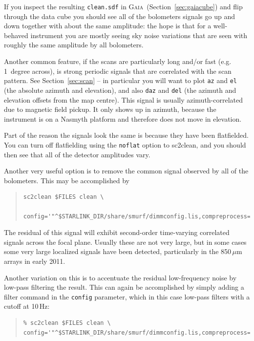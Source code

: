 \documentclass[twoside,11pt]{article}
\newcommand{\htmlref}[2]{#1}
\newcommand{\latexhtml}[2]{#1}
\newcommand{\xref}[3]{#1}
\renewcommand{\_}{\texttt{\symbol{95}}}
\newenvironment{myquote}{\begin{quote}\begin{small}}{\end{small}\end{quote}}
\newcommand{\gaia}{\xref{\textsc{Gaia}}{sun214}{}}
\newcommand{\task}[1]{\textsf{#1}}
\newcommand{\cref}[3]{\latexhtml{#1~\ref{#2}}{\htmlref{#3}{#2}}}
\begin{document}
If you inspect the resulting \texttt{clean.sdf} in \gaia\
(\cref{Section}{sec:gaiacube}{Displaying time-series data}) and flip
through the data cube you should
see all of the bolometers signals go up and down together with about
the same amplitude: the hope is that for a well-behaved instrument you
are mostly seeing sky noise variations that are seen with roughly the
same amplitude by all bolometers.

Another common feature, if the scans are particularly long and/or fast
(e.g. 1~degree across), is strong periodic signals that are correlated
with the scan pattern. See \cref{Section}{sec:scan}{Displaying scan
patterns} -- in particular
you will want to plot \texttt{az} and \texttt{el} (the absolute
azimuth and elevation), and also \texttt{daz} and \texttt{del} (the
azimuth and elevation offsets from the map centre). This signal is
usually azimuth-correlated due to magnetic field pickup. It only shows
up in azimuth, because the instrument is on a Nasmyth platform and
therefore does not move in elevation.

Part of the reason the signals look the same is because they have been
flatfielded. You can turn off flatfielding using the \texttt{noflat}
option to \task{sc2clean}, and you should then see that all of the detector
amplitudes vary.

Another very useful option is to remove the common signal observed by
all of the bolometers. This may be accomplished by

\begin{myquote}
\begin{verbatim}
sc2clean $FILES clean \
   config='"^$STARLINK_DIR/share/smurf/dimmconfig.lis,compreprocess=1"'
\end{verbatim}
\end{myquote}

The residual of this signal will exhibit second-order time-varying
correlated signals across the focal plane. Usually these are not very
large, but in some cases some very large localized signals have been
detected, particularly in the 850\,$\mu$m arrays in early 2011.

Another variation on this is to accentuate the residual low-frequency
noise by low-pass filtering the result. This can again be accomplished
by simply adding a filter command in the \texttt{config} parameter,
which in this case low-pass filters with a cutoff at 10\,Hz:

\begin{myquote}
\begin{verbatim}
% sc2clean $FILES clean \
config='"^$STARLINK_DIR/share/smurf/dimmconfig.lis,compreprocess=1,filt_edgelow=10"'
\end{verbatim}
\end{myquote}
\end{document}
